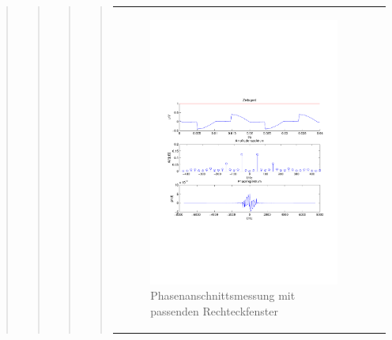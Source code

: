 \begin{quote}
\begin{quote}
\begin{quote}
\begin{quote}
\begin{center}
\begin{tabular}{ll}
\begin{minipage}{0.6\textwidth}
                        \begin{figure}[H]
                            \label{fig:}
                            \includegraphics[scale=0.4, trim = 1.5cm 7cm 1.5cm 8cm,
                            clip]{./Bilder/Phasenanschnittsmessungmitrechteckfenster} %
                            \caption{Phasenanschnittsmessung mit passenden Rechteckfenster}
                        \end{figure}
    
                    \end{minipage}
                    \begin{minipage}{0.6\textwidth}
    

\end{minipage}
\end{tabular}
\end{center}
\end{quote}
\end{quote}
\end{quote}
\end{quote}
